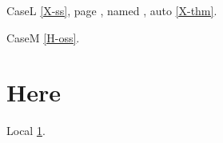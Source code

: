 \documentclass{article}
\begin{document}
CaseL \ref{X-ss}, page \pageref{X-front}, named ,
auto \autoref{X-thm}.

CaseM \ref{H-oss}.

\section{Here}\label{here}
Local \ref{here}.
\end{document}
